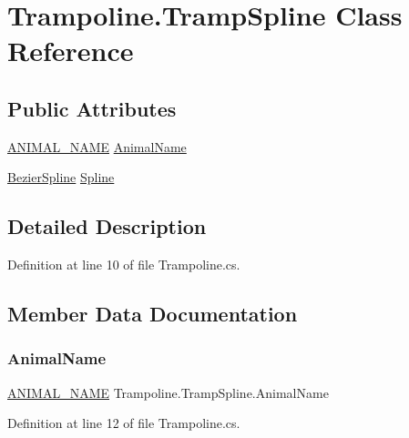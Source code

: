 \hypertarget{class_trampoline_1_1_tramp_spline}{}\section{Trampoline.\+Tramp\+Spline Class Reference}
\label{class_trampoline_1_1_tramp_spline}
\subsection*{Public Attributes}
\begin{DoxyCompactItemize}
\item 
\mbox{\hyperlink{_animal_8cs_a2fa5713399b84d1b88dae9196837af50}{A\+N\+I\+M\+A\+L\+\_\+\+N\+A\+ME}} \mbox{\hyperlink{class_trampoline_1_1_tramp_spline_a72a48586162feb3ff343276246dd77e3}{Animal\+Name}}
\item 
\mbox{\hyperlink{class_bezier_spline}{Bezier\+Spline}} \mbox{\hyperlink{class_trampoline_1_1_tramp_spline_a579fc3045ac43b0cc882a6d4f0341cd0}{Spline}}
\end{DoxyCompactItemize}


\subsection{Detailed Description}


Definition at line 10 of file Trampoline.\+cs.



\subsection{Member Data Documentation}
\mbox{\label{class_trampoline_1_1_tramp_spline_a72a48586162feb3ff343276246dd77e3}} 
\subsubsection{\texorpdfstring{Animal\+Name}{AnimalName}}
{\footnotesize\ttfamily \mbox{\hyperlink{_animal_8cs_a2fa5713399b84d1b88dae9196837af50}{A\+N\+I\+M\+A\+L\+\_\+\+N\+A\+ME}} Trampoline.\+Tramp\+Spline.\+Animal\+Name}



Definition at line 12 of file Trampoline.\+cs.

